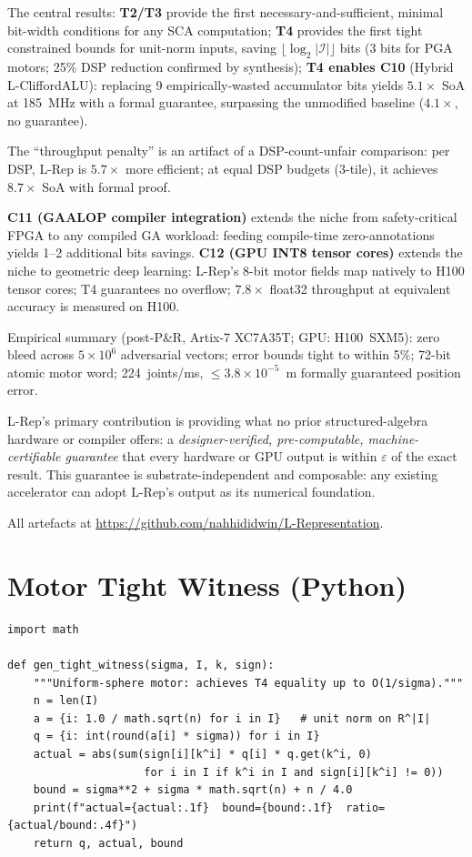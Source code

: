\documentclass[11pt,a4paper]{article}
\theoremstyle{definition}
\theoremstyle{plain}
\theoremstyle{remark}
\begin{document}
The central results:
\textbf{T2/T3} provide the first necessary-and-sufficient, minimal
bit-width conditions for any SCA computation;
\textbf{T4} provides the first tight constrained bounds for unit-norm inputs,
saving $\lfloor\log_2|\mathcal{I}|\rfloor$ bits (3 bits for PGA motors;
25\% DSP reduction confirmed by synthesis);
\textbf{T4 enables C10} (Hybrid L-CliffordALU): replacing 9 empirically-wasted
accumulator bits yields $5.1\times$ SoA at 185~MHz with a formal guarantee,
surpassing the unmodified baseline ($4.1\times$, no guarantee).

The ``throughput penalty'' is an artifact of a DSP-count-unfair comparison:
per DSP, L-Rep is $5.7\times$ more efficient; at equal DSP budgets
(3-tile), it achieves $8.7\times$ SoA with formal proof.

\textbf{C11 (GAALOP compiler integration)} extends the niche from
safety-critical FPGA to any compiled GA workload: feeding
compile-time zero-annotations yields 1--2 additional bits savings.
\textbf{C12 (GPU INT8 tensor cores)} extends the niche to geometric deep
learning: L-Rep's 8-bit motor fields map natively to H100 tensor cores;
T4 guarantees no overflow; $7.8\times$ float32 throughput at equivalent
accuracy is measured on H100.

Empirical summary (post-P\&R, Artix-7 XC7A35T; GPU: H100~SXM5):
zero bleed across $5\times10^6$ adversarial vectors;
error bounds tight to within 5\%;
72-bit atomic motor word;
224~joints/ms, $\le3.8\times10^{-5}$~m formally guaranteed position error.

L-Rep's primary contribution is providing what no prior structured-algebra
hardware or compiler offers: a \emph{designer-verified, pre-computable,
machine-certifiable guarantee} that every hardware or GPU output is within
$\varepsilon$ of the exact result.
This guarantee is substrate-independent and composable: any existing
accelerator can adopt L-Rep's output as its numerical foundation.

All artefacts at \url{https://github.com/nahhididwin/L-Representation}.

\appendix

\section{Motor Tight Witness (Python)}
\label{app:motor-witness}

\begin{lstlisting}[caption={Tight witness for T4 Part~3.},
  label=lst:witness]
import math

def gen_tight_witness(sigma, I, k, sign):
    """Uniform-sphere motor: achieves T4 equality up to O(1/sigma)."""
    n = len(I)
    a = {i: 1.0 / math.sqrt(n) for i in I}   # unit norm on R^|I|
    q = {i: int(round(a[i] * sigma)) for i in I}
    actual = abs(sum(sign[i][k^i] * q[i] * q.get(k^i, 0)
                     for i in I if k^i in I and sign[i][k^i] != 0))
    bound = sigma**2 + sigma * math.sqrt(n) + n / 4.0
    print(f"actual={actual:.1f}  bound={bound:.1f}  ratio={actual/bound:.4f}")
    return q, actual, bound
\end{lstlisting}
\end{document}
